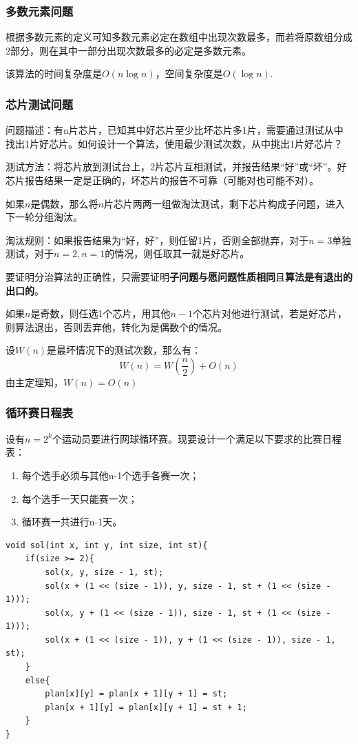 \documentclass[./../main.tex]{subfiles}
\begin{document}
\subsubsection{多数元素问题}
根据多数元素的定义可知多数元素必定在数组中出现次数最多，而若将原数组分成2部分，则在其中一部分出现次数最多的必定是多数元素。

该算法的时间复杂度是$O(n\log n)$，空间复杂度是$O(\log n)$.

\subsubsection{芯片测试问题}
问题描述：有n片芯片，已知其中好芯片至少比坏芯片多1片，需要通过测试从中找出1片好芯片。如何设计一个算法，使用最少测试次数，从中挑出1片好芯片？

测试方法：将芯片放到测试台上，2片芯片互相测试，并报告结果“好”或“坏”。好芯片报告结果一定是正确的，坏芯片的报告不可靠（可能对也可能不对）。

如果$n$是偶数，那么将$n$片芯片两两一组做淘汰测试，剩下芯片构成子问题，进入下一轮分组淘汰。

淘汰规则：如果报告结果为“好，好”，则任留1片，否则全部抛弃，对于$n=3$单独测试，对于$n=2,n=1$的情况，则任取其一就是好芯片。

要证明分治算法的正确性，只需要证明\textbf{子问题与愿问题性质相同}且\textbf{算法是有退出的出口的}。

如果$n$是奇数，则任选1个芯片，用其他$n-1$个芯片对他进行测试，若是好芯片，则算法退出，否则丢弃他，转化为是偶数个的情况。

设$W(n)$是最坏情况下的测试次数，那么有：
\[
    W(n)=W(\frac{n}{2})+O(n)
\]
由主定理知，$W(n)=O(n)$

\subsubsection{循环赛日程表}
设有$n=2^k$个运动员要进行网球循环赛。现要设计一个满足以下要求的比赛日程表：

\begin{enumerate}
    \item 每个选手必须与其他n-1个选手各赛一次；
    \item 每个选手一天只能赛一次；
    \item 循环赛一共进行n-1天。
\end{enumerate}

\begin{lstlisting}
void sol(int x, int y, int size, int st){
    if(size >= 2){
        sol(x, y, size - 1, st);
        sol(x + (1 << (size - 1)), y, size - 1, st + (1 << (size - 1)));
        sol(x, y + (1 << (size - 1)), size - 1, st + (1 << (size - 1)));
        sol(x + (1 << (size - 1)), y + (1 << (size - 1)), size - 1, st);
    }
    else{
        plan[x][y] = plan[x + 1][y + 1] = st;
        plan[x + 1][y] = plan[x][y + 1] = st + 1;
    }
}
\end{lstlisting}
\end{document}
